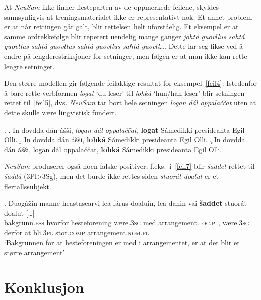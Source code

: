 \documentclass{flammie}
\begin{document}
At \textit{NeuSam} ikke finner flesteparten av de oppmerkede feilene, skyldes
sannsynligvis at treningsmaterialet ikke er representativt nok. Et annet problem
er at når rettingen går galt, blir rettelsen helt uforståelig. Et eksempel er at
samme ordrekkefølge blir repetert uendelig mange ganger \textit{johtá guovllus
sahtá guovllus sahtá guovllus sahtá guovllus sahtá guovll\ldots}. Dette lar seg
fikse ved å endre på lengderestriksjoner for setninger, men følgen er at man
ikke kan rette lengre setninger.


Den større modellen gir følgende feilaktige resultat for eksempel~\ref{feil4}:
Istedenfor å bare rette verbformen \textit{logat} `du leser' til \textit{lohká}
`hun/han leser' blir setningen rettet til~\ref{feil5}, dvs. \textit{NeuSam} tar
bort hele setningen \textit{logan dál oppalaččat} uten at dette skulle være
lingvistisk fundert.

\ex.
\a.	In dovdda dán ášši, \textit{logan dál oppalaččat,}  \textbf{logat} Sámedikki presideanta Egil Olli.\label{feil4}
\b. In dovdda dán ášši,  \textbf{lohká} Sámedikki presideanta Egil Olli.\label{feil5}
\c. In dovdda dán ášši, logan dál oppalaččat,  \textbf{lohká} Sámedikki presideanta Egil Olli.\label{feil6}


\textit{NeuSam} produserer også noen falske positiver, f.eks.\ i~\ref{feil7}
blir \textit{šaddet} rettet til \textit{šaddá} (3Pl>3Sg), men det burde ikke
rettes siden \textit{stuorát doalut} er et flertallssubjekt.

\exg. Duogážin manne heastasearvi lea fárus doaluin, lea danin vai \textbf{šaddet} stuorát doalut [\ldots]\label{feil7}\\
bakgrunn\textsc{.ess} hvorfor hesteforening være\textsc{.3sg} med arrangement\textsc{.loc.pl}, være\textsc{.3sg} derfor at bli\textsc{.3pl} stor\textsc{.comp} arrangement\textsc{.nom.pl}\\
`Bakgrunnen for at hesteforeningen er med i arrangementet, er at det blir et større arrangement'


\section{Konklusjon}
\end{document}
